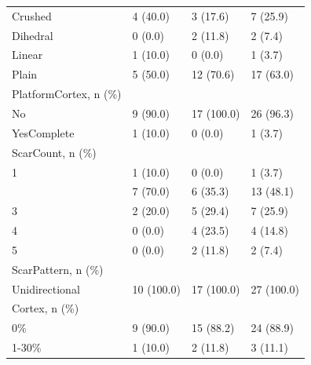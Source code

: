 \documentclass[12pt,twoside]{reedthesis}
\begin{document}
\begin{longtable}[t]{llll}
Crushed & 4 (40.0) & 3 (17.6) & 7 (25.9)\\
Dihedral & 0 (0.0) & 2 (11.8) & 2 (7.4)\\
Linear & 1 (10.0) & 0 (0.0) & 1 (3.7)\\
Plain & 5 (50.0) & 12 (70.6) & 17 (63.0)\\
\addlinespace
PlatformCortex, n (\%) &  &  & \\
No & 9 (90.0) & 17 (100.0) & 26 (96.3)\\
YesComplete & 1 (10.0) & 0 (0.0) & 1 (3.7)\\
ScarCount, n (\%) &  &  & \\
1 & 1 (10.0) & 0 (0.0) & 1 (3.7)\\
\addlinespace
2 & 7 (70.0) & 6 (35.3) & 13 (48.1)\\
3 & 2 (20.0) & 5 (29.4) & 7 (25.9)\\
4 & 0 (0.0) & 4 (23.5) & 4 (14.8)\\
5 & 0 (0.0) & 2 (11.8) & 2 (7.4)\\
ScarPattern, n (\%) &  &  & \\
\addlinespace
Unidirectional & 10 (100.0) & 17 (100.0) & 27 (100.0)\\
Cortex, n (\%) &  &  & \\
0\% & 9 (90.0) & 15 (88.2) & 24 (88.9)\\
1-30\% & 1 (10.0) & 2 (11.8) & 3 (11.1)\\*
\end{longtable}
\endgroup{}

\newpage
\end{document}
